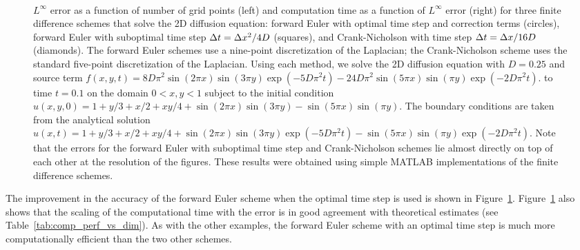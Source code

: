 \documentclass[oneeqnum,onefignum,onetabnum,onethmnum]{siamltex}
\begin{document}
\begin{figure}[tb]
\begin{center}
\ \ 
\caption{$L^\infty$ error as a function of number of grid points (left)
and computation time as a function of $L^\infty$ error (right) for three
finite difference schemes that solve the 2D diffusion equation:
forward Euler with optimal time step and correction terms (circles), forward 
Euler with suboptimal time step $\Delta t = \Delta x^2/4D$ (squares), and 
Crank-Nicholson with time step $\Delta t = \Delta x/16D$ (diamonds).  
The forward Euler schemes use a nine-point discretization of the Laplacian;
the Crank-Nicholson scheme uses the standard five-point discretization of
the Laplacian.  Using each method, we solve the 2D diffusion equation with 
$D = 0.25$ and source term 
$f(x,y,t) = 8 D \pi^2 \sin(2 \pi x) \sin(3 \pi y) 
            \exp\left(-5 D \pi^2 t\right)
          - 24 D \pi^2 \sin(5 \pi x) \sin(\pi y) 
            \exp \left(-2 D \pi^2 t \right)$.
to time $t = 0.1$ on the domain $0 < x, y < 1$ subject 
to the initial condition
$u(x,y,0) =  1 + y/3 + x/2 + xy/4 
          + \sin(2 \pi x) \sin(3 \pi y) - \sin(5 \pi x) \sin(\pi y)$.
The boundary conditions are taken from the analytical solution 
$u(x,t) = 1 + y/3 + x/2 + xy/4 
          + \sin(2 \pi x) \sin(3 \pi y) \exp(-5 D \pi^2 t) 
          - \sin(5 \pi x) \sin(\pi y) \exp(-2 D \pi^2 t)
$.
Note that the errors for the forward Euler with suboptimal time step and 
Crank-Nicholson schemes lie almost directly on top of each other at the 
resolution of the figures.  
These results were obtained using simple MATLAB implementations of the 
finite difference schemes.
}
\label{fig:diffusion_eqn_2d_src_analysis}
\end{center}
\end{figure}

The improvement in the accuracy of the forward Euler scheme when the optimal 
time step is used is shown in Figure~\ref{fig:diffusion_eqn_2d_src_analysis}.
Figure~\ref{fig:diffusion_eqn_2d_src_analysis} also shows that the 
scaling of the computational time with the error is in good agreement with 
theoretical estimates (see Table~\ref{tab:comp_perf_vs_dim}).  As with the
other examples, the forward Euler scheme with an optimal time step is much 
more computationally efficient than the two other schemes.  
\end{document}
